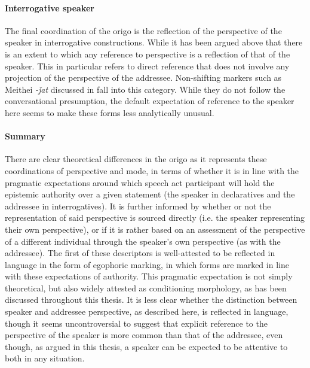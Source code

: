 \paragraph{Interrogative speaker}
The final coordination of the origo is the reflection of the perspective of the speaker in interrogative constructions. While it has been argued above that there is an extent to which any reference to perspective is a reflection of that of the speaker. This in particular refers to direct reference that does not involve any projection of the perspective of the addressee. Non-shifting markers such as Meithei \textit{-ǰat} discussed in  fall into this category. While they do not follow the conversational presumption, the default expectation of reference to the speaker here seems to make these forms less analytically unusual.

\paragraph{Summary}
There are clear theoretical differences in the origo as it represents these coordinations of perspective and mode, in terms of whether it is in line with the pragmatic expectations around which speech act participant will hold the epistemic authority over a given statement (the speaker in declaratives and the addressee in interrogatives). It is further informed by whether or not the representation of said perspective is sourced directly (i.e. the speaker representing their own perspective), or if it is rather based on an assessment of the perspective of a different individual through the speaker's own perspective (as with the addressee). The first of these descriptors is well-attested to be reflected in language in the form of egophoric marking, in which forms are marked in line with these expectations of authority. This pragmatic expectation is not simply theoretical, but also widely attested as conditioning morphology, as has been discussed throughout this thesis. It is less clear whether the distinction between speaker and addressee perspective, as described here, is reflected in language, though it seems uncontroversial to suggest that explicit reference to the perspective of the speaker is more common than that of the addressee, even though, as argued in this thesis, a speaker can be expected to be attentive to both in any situation. 

